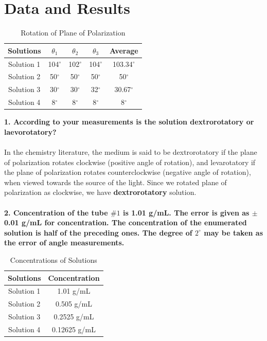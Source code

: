 \documentclass[a4paper,12pt]{report}
\begin{document}
\chapter{Data and Results}
\begin{table}[h]
	\begin{center}
\begin{tabular}{|c|c|c|c|c|}
	\hline Solutions & $\theta_{1}$ & $\theta_{2}$ & $\theta_{3}$ & Average \\ 
	\hline Solution 1 & 104$^{\circ}$
	 & 102$^{\circ}$
	  & 104$^{\circ}$
	   & 103.34$^{\circ}$
	    \\ 
	\hline Solution 2 & 50$^{\circ}$
	 & 50$^{\circ}$
	  & 50$^{\circ}$
	   & 50$^{\circ}$
	    \\ 
	\hline Solution 3 & 30$^{\circ}$
	 & 30$^{\circ}$
	  & 32$^{\circ}$
	   & 30.67$^{\circ}$
	    \\ 
	\hline Solution 4 & 8$^{\circ}$
	 & 8$^{\circ}$
	  & 8$^{\circ}$
	   & 8$^{\circ}$
	    \\ 
	\hline 
\end{tabular} 
\end{center}
\caption{Rotation of Plane of Polarization}
\end{table}
\textbf{1. According to your measurements is the solution dextrorotatory or laevorotatory?}\\\\
In the chemistry literature, the medium is said to be dextrorotatory if the plane
of polarization rotates clockwise (positive angle of rotation), and levarotatory if
the plane of polarization rotates counterclockwise (negative angle of rotation), when
viewed towards the source of the light. Since we rotated plane of polarization as clockwise, we have \textbf{dextrorotatory} solution.\\\\
\textbf{2. Concentration of the tube $\#1$ is 1.01 g/mL. The error is given as $\pm$ 0.01 g/mL for concentration. The concentration of the enumerated solution is half of the preceding ones. The degree of $2^{\circ}$ may be taken as the error of angle measurements.}
\begin{table}[h]
	\begin{center}
\begin{tabular}{|c|c|}
	\hline Solutions & Concentration \\ 
	\hline Solution 1 & 1.01 g/mL \\ 
	\hline Solution 2 & 0.505 g/mL \\ 
	\hline Solution 3 & 0.2525 g/mL \\ 
	\hline Solution 4 & 0.12625 g/mL \\ 
	\hline 
\end{tabular} 
\end{center}
\caption{Concentrations of Solutions}
\end{table}
\end{document}
